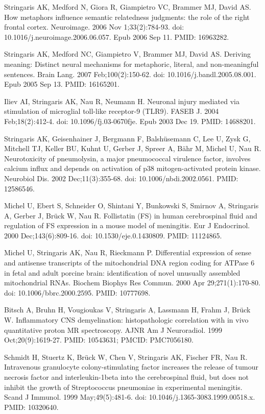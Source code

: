 \documentclass[
]{article}
\begin{document}
Stringaris AK, Medford N, Giora R, Giampietro VC, Brammer MJ, David AS.
How metaphors influence semantic relatedness judgments: the role of the
right frontal cortex. Neuroimage. 2006 Nov 1;33(2):784-93. doi:
10.1016/j.neuroimage.2006.06.057. Epub 2006 Sep 11. PMID: 16963282.

Stringaris AK, Medford NC, Giampietro V, Brammer MJ, David AS. Deriving
meaning: Distinct neural mechanisms for metaphoric, literal, and
non-meaningful sentences. Brain Lang. 2007 Feb;100(2):150-62. doi:
10.1016/j.bandl.2005.08.001. Epub 2005 Sep 13. PMID: 16165201.

Iliev AI, Stringaris AK, Nau R, Neumann H. Neuronal injury mediated via
stimulation of microglial toll-like receptor-9 (TLR9). FASEB J. 2004
Feb;18(2):412-4. doi: 10.1096/fj.03-0670fje. Epub 2003 Dec 19. PMID:
14688201.

Stringaris AK, Geisenhainer J, Bergmann F, Balshüsemann C, Lee U, Zysk
G, Mitchell TJ, Keller BU, Kuhnt U, Gerber J, Spreer A, Bähr M, Michel
U, Nau R. Neurotoxicity of pneumolysin, a major pneumococcal virulence
factor, involves calcium influx and depends on activation of p38
mitogen-activated protein kinase. Neurobiol Dis. 2002 Dec;11(3):355-68.
doi: 10.1006/nbdi.2002.0561. PMID: 12586546.

Michel U, Ebert S, Schneider O, Shintani Y, Bunkowski S, Smirnov A,
Stringaris A, Gerber J, Brück W, Nau R. Follistatin (FS) in human
cerebrospinal fluid and regulation of FS expression in a mouse model of
meningitis. Eur J Endocrinol. 2000 Dec;143(6):809-16. doi:
10.1530/eje.0.1430809. PMID: 11124865.

Michel U, Stringaris AK, Nau R, Rieckmann P. Differential expression of
sense and antisense transcripts of the mitochondrial DNA region coding
for ATPase 6 in fetal and adult porcine brain: identification of novel
unusually assembled mitochondrial RNAs. Biochem Biophys Res Commun. 2000
Apr 29;271(1):170-80. doi: 10.1006/bbrc.2000.2595. PMID: 10777698.

Bitsch A, Bruhn H, Vougioukas V, Stringaris A, Lassmann H, Frahm J,
Brück W. Inflammatory CNS demyelination: histopathologic correlation
with in vivo quantitative proton MR spectroscopy. AJNR Am J Neuroradiol.
1999 Oct;20(9):1619-27. PMID: 10543631; PMCID: PMC7056180.

Schmidt H, Stuertz K, Brück W, Chen V, Stringaris AK, Fischer FR, Nau R.
Intravenous granulocyte colony-stimulating factor increases the release
of tumour necrosis factor and interleukin-1beta into the cerebrospinal
fluid, but does not inhibit the growth of Streptococcus pneumoniae in
experimental meningitis. Scand J Immunol. 1999 May;49(5):481-6. doi:
10.1046/j.1365-3083.1999.00518.x. PMID: 10320640.
\end{document}
